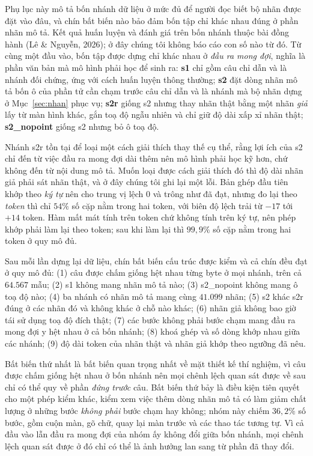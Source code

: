 \documentclass[12pt,a4paper,onecolumn]{article}
\newcommand{\ôvuông}[2]{\tikz[baseline=-0.45ex]{\draw[#1,line width=0.9pt,#2] (0,0) rectangle (0.34,0.18);}}
\begin{document}
Phụ lục này mô tả bốn nhánh dữ liệu ở mức đủ để người đọc biết bộ nhãn được đặt vào
đâu, và chín bất biến nào bảo đảm bốn tập chỉ khác nhau đúng ở phần nhãn mô tả. Kết quả huấn luyện
và đánh giá trên bốn nhánh thuộc bài đồng hành (Lê \& Nguyễn, 2026); ở đây chúng tôi không
báo cáo con số nào từ đó. Từ cùng một đầu vào, bốn tập được dựng chỉ khác nhau ở \emph{đầu
ra mong đợi}, nghĩa là phần văn bản mà mô hình phải học để sinh ra: \textbf{s1} chỉ gồm câu chỉ
dẫn và là nhánh đối chứng, ứng với cách huấn luyện thông thường; \textbf{s2} đặt dòng nhãn
mô tả bốn ô của phần tử cần chạm trước câu chỉ dẫn và là nhánh mà bộ nhãn dựng ở
Mục~\ref{sec:nhan} phục vụ; \textbf{s2r} giống s2 nhưng thay nhãn thật bằng một nhãn
\emph{giả} lấy từ màn hình khác, gắn toạ độ ngẫu nhiên và chỉ giữ độ dài xấp xỉ nhãn thật;
\textbf{s2\_nopoint} giống s2 nhưng bỏ ô toạ độ.

Nhánh s2r tồn tại để loại một cách giải thích thay thế cụ thể, rằng lợi ích của s2 chỉ
đến từ việc đầu ra mong đợi dài thêm nên mô hình phải học kỹ hơn, chứ không đến từ nội dung mô
tả. Muốn loại được cách giải thích đó thì độ dài nhãn giả phải sát nhãn thật, và ở đây chúng
tôi ghi lại một lỗi. Bản ghép đầu tiên khớp theo \emph{ký tự} nên cho trung vị lệch $0$ và
trông như đã đạt, nhưng đo lại theo \emph{token} thì chỉ $54\%$ số cặp nằm trong hai
token, với biên độ lệch trải từ $-17$ tới $+14$ token. Hàm mất mát tính trên token chứ không tính trên ký tự,
nên phép khớp phải làm lại theo token; sau khi làm lại thì $99{,}9\%$ số cặp nằm trong hai
token ở quy mô đủ.

Sau mỗi lần dựng lại dữ liệu, chín bất biến cấu trúc được kiểm và cả chín đều đạt ở quy mô
đủ: (1) câu được chấm giống hệt nhau từng byte ở mọi nhánh, trên cả $64.567$ mẫu; (2) s1
không mang nhãn mô tả nào; (3) s2\_nopoint không mang ô toạ độ nào; (4) ba nhánh có nhãn
mô tả mang cùng $41.099$ nhãn; (5) s2 khác s2r đúng ở các nhãn đó và không khác ở chỗ nào
khác; (6) nhãn giả không bao giờ tái sử dụng toạ độ đích thật; (7) các bước không phải
bước chạm mang đầu ra mong đợi y hệt nhau ở cả bốn nhánh; (8) khoá ghép và số dòng khớp
nhau giữa các nhánh; (9) độ dài token của nhãn thật và nhãn giả khớp theo ngưỡng đã nêu.

Bất biến thứ nhất là bất biến quan trọng nhất về mặt thiết kế thí nghiệm, vì câu được
chấm giống hệt nhau ở bốn nhánh nên mọi chênh lệch quan sát được về sau chỉ có thể quy về
phần \emph{đứng trước} câu. Bất biến thứ bảy là điều kiện tiên quyết cho một phép kiểm khác,
kiểm xem việc thêm dòng nhãn mô tả có làm giảm chất lượng ở những bước \emph{không phải}
bước chạm hay không; nhóm này chiếm $36{,}2\%$ số bước, gồm cuộn màn, gõ chữ, quay lại màn
trước và các thao tác tương tự. Vì cả đầu vào lẫn đầu ra mong đợi của nhóm ấy không đổi
giữa bốn nhánh, mọi chênh lệch quan sát được ở đó chỉ có thể là ảnh hưởng lan sang từ phần
đã thay đổi.
\end{document}
